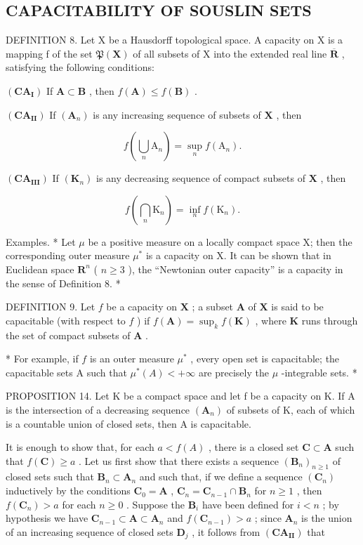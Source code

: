 \subsection{CAPACITABILITY OF SOUSLIN SETS}

DEFINITION 8. Let X be a Hausdorff topological space. A capacity on X is a mapping f of the set \(\mathfrak{P}(\mathbf{X})\) of all subsets of X into the extended real line \(\overline{\mathbf{R}}\) , satisfying the following conditions:

\((\mathbf{CA}_{\mathbf{I}})\) If \(\mathbf{A} \subset \mathbf{B}\) , then \(f(\mathbf{A}) \leqslant f(\mathbf{B})\) .

\((\mathbf{CA}_{\mathbf{II}})\) If \((\mathbf{A}_n)\) is any increasing sequence of subsets of \(\mathbf{X}\) , then

\[
f \left(\bigcup_ {n} \mathrm{A} _ {n}\right) = \sup _ {n} f (\mathrm{A} _ {n}).
\]

\((\mathbf{CA}_{\mathbf{III}})\) If \((\mathbf{K}_n)\) is any decreasing sequence of compact subsets of \(\mathbf{X}\) , then

\[
f \left(\bigcap_ {n} \mathrm{K} _ {n}\right) = \inf _ {n} f (\mathrm{K} _ {n}).
\]

Examples. * Let \(\mu\) be a positive measure on a locally compact space X; then the corresponding outer measure \(\mu^{*}\) is a capacity on X. It can be shown that in Euclidean space \(\mathbf{R}^{n}\) ( \(n \geqslant 3\) ), the ``Newtonian outer capacity'' is a capacity in the sense of Definition 8. *

DEFINITION 9. Let \(f\) be a capacity on \(\mathbf{X}\) ; a subset \(\mathbf{A}\) of \(\mathbf{X}\) is said to be capacitable (with respect to \(f\) ) if \(f(\mathbf{A}) = \sup_k f(\mathbf{K})\) , where \(\mathbf{K}\) runs through the set of compact subsets of \(\mathbf{A}\) .

* For example, if \(f\) is an outer measure \(\mu^{*}\) , every open set is capacitable; the capacitable sets A such that \(\mu^{*}(A) < +\infty\) are precisely the \(\mu\) -integrable sets. *

PROPOSITION 14. Let K be a compact space and let f be a capacity on K. If A is the intersection of a decreasing sequence \((\mathbf{A}_{n})\) of subsets of K, each of which is a countable union of closed sets, then A is capacitable.

It is enough to show that, for each \(a < f(A)\) , there is a closed set \(\mathbf{C} \subset \mathbf{A}\) such that \(f(\mathbf{C}) \geqslant a\) . Let us first show that there exists a sequence \((\mathbf{B}_n)_{n \geqslant 1}\) of closed sets such that \(\mathbf{B}_n \subset \mathbf{A}_n\) and such that, if we define a sequence \((\mathbf{C}_n)\) inductively by the conditions \(\mathbf{C}_0 = \mathbf{A}\) , \(\mathbf{C}_n = \mathbf{C}_{n-1} \cap \mathbf{B}_n\) for \(n \geqslant 1\) , then \(f(\mathbf{C}_n) > a\) for each \(n \geqslant 0\) . Suppose the \(\mathbf{B}_i\) have been defined for \(i < n\) ; by hypothesis we have \(\mathbf{C}_{n-1} \subset \mathbf{A} \subset \mathbf{A}_n\) and \(f(\mathbf{C}_{n-1}) > a\) ; since \(\mathbf{A}_n\) is the union of an increasing sequence of closed sets \(\mathbf{D}_j\) , it follows from \((\mathbf{CA}_{\mathbf{II}})\) that

